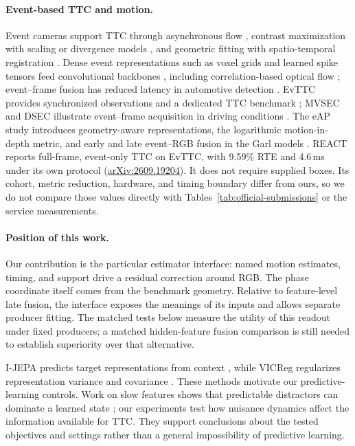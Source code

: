 \paragraph{Event-based TTC and motion.} Event cameras support TTC through asynchronous flow \citep{clady2014}, contrast maximization with scaling or divergence models \citep{gallego2018cmax,mcleod2022}, and geometric fitting with spatio-temporal registration \citep{eventaided}. Dense event representations such as voxel grids and learned spike tensors feed convolutional backbones \citep{zhu2019voxel,gehrig2019est}, including correlation-based optical flow \citep{gehrig2021eraft}; event--frame fusion has reduced latency in automotive detection \citep{gehrig2024dagr}. EvTTC provides synchronized observations and a dedicated TTC benchmark \citep{evttc}; MVSEC and DSEC illustrate event--frame acquisition in driving conditions \citep{zhu2018mvsec,dsec}. The eAP study introduces geometry-aware representations, the logarithmic motion-in-depth metric, and early and late event--RGB fusion in the Garl models \citep{eap}. REACT reports full-frame, event-only TTC on EvTTC, with 9.59\% RTE and 4.6\,ms under its own protocol (\href{https://arxiv.org/abs/2609.19204}{arXiv:2609.19204}). It does not require supplied boxes. Its cohort, metric reduction, hardware, and timing boundary differ from ours, so we do not compare those values directly with Tables~\ref{tab:official-submissions} or the service measurements. \paragraph{Position of this work.} Our contribution is the particular estimator interface: named motion estimates, timing, and support drive a residual correction around RGB. The phase coordinate itself comes from the benchmark geometry. Relative to feature-level late fusion, the interface exposes the meanings of its inputs and allows separate producer fitting. The matched tests below measure the utility of this readout under fixed producers; a matched hidden-feature fusion comparison is still needed to establish superiority over that alternative.

I-JEPA predicts target representations from context \citep{ijepa}, while VICReg regularizes representation variance and covariance \citep{vicreg}. These methods motivate our predictive-learning controls. Work on slow features shows that predictable distractors can dominate a learned state \citep{slowfeatures}; our experiments test how nuisance dynamics affect the information available for TTC. They support conclusions about the tested objectives and settings rather than a general impossibility of predictive learning.
